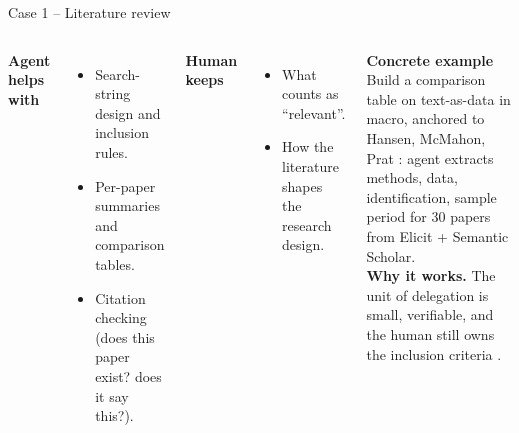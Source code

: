 \begin{frame}{Case 1 -- Literature review}
  \begin{columns}[T,onlytextwidth]
      \textbf{Agent helps with}
      \begin{itemize}\setlength\itemsep{0.3em}
        \item Search-string design and inclusion rules.
        \item Per-paper summaries and comparison tables.
        \item Citation checking (does this paper exist? does it say this?).
      \end{itemize}
      \vspace{0.2cm}
      \textbf{Human keeps}
      \begin{itemize}\setlength\itemsep{0.3em}
        \item What counts as ``relevant''.
        \item How the literature shapes the research design.
      \end{itemize}
      \textbf{Concrete example}\\[0.15cm]
      \scriptsize
      Build a comparison table on text-as-data in macro, anchored to Hansen, McMahon, Prat \citeyearpar{hansen_qje_2018}: agent extracts methods, data, identification, sample period for 30 papers from Elicit + Semantic Scholar.\\[0.2cm]
      \textbf{Why it works.} The unit of delegation is small, verifiable, and the human still owns the inclusion criteria \citep{korinek_jel_2023}.
  \end{columns}
\end{frame}

